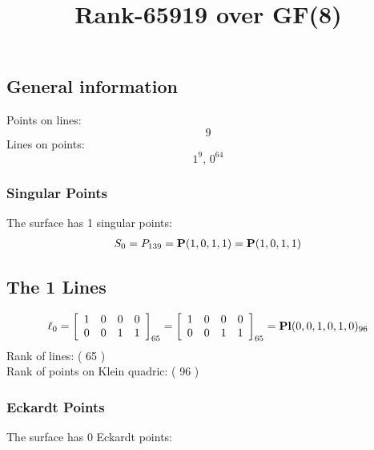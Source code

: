 \documentclass{article}
\newcommand\setTBstruts{\def\T{\rule{0pt}{2.6ex}}%
\def\B{\rule[-1.2ex]{0pt}{0pt}}}
\newcommand{\bP}{{\bf P}}
\begin{document}
 
\setTBstruts



{\allowdisplaybreaks%






\title{Rank-65919 over GF(8)}
\author{}%
\maketitle%
%
{}



\subsection*{General information}
Points on lines:
$$
9$$
Lines on points:
$$
1^9,\,0^{64}$$
\subsubsection*{Singular Points}
The surface has 1 singular points:\\
\begin{align*}
S_{0} &= P_{139}=\bP(1, 0, 1, 1) = \bP(1, 0, 1, 1)\\
\end{align*}
\subsection*{The 1 Lines}
$$
\ell_{0} = 
\left[
\begin{array}{*{4}{r}}
1 & 0 & 0 & 0\\
0 & 0 & 1 & 1\\
\end{array}
\right]
_{65}
=
\left[
\begin{array}{*{4}c}
1  & 0  & 0  & 0\\
0  & 0  & 1  & 1\\
\end{array}
\right]_{65}
={\rm\bf Pl}(0,0,1,0,1,0 )_{96}$$
Rank of lines: ( 65 )\\
Rank of points on Klein quadric: ( 96 )\\
\subsubsection*{Eckardt Points}
The surface has 0 Eckardt points:\\
}
\end{document}
